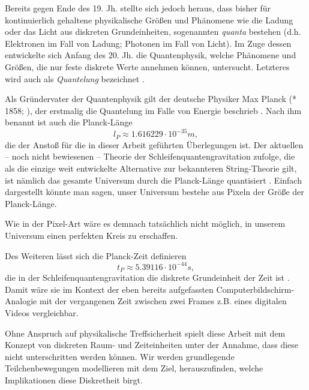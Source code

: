 \documentclass[a4paper,12pt,ngerman]{scrartcl}
\theoremstyle{plain}
\theoremstyle{plain}
\theoremstyle{plain}
\theoremstyle{plain}
\begin{document}
Bereits gegen Ende des 19. Jh. stellte sich jedoch heraus, dass bisher für kontinuierlich gehaltene physikalische Größen und Phänomene wie die Ladung oder das Licht aus diskreten Grundeinheiten, sogenannten \textit{quanta} bestehen (d.h. Elektronen im Fall von Ladung; Photonen im Fall von Licht). Im Zuge dessen entwickelte sich Anfang des 20. Jh. die Quantenphysik, welche Phänomene und Größen, die nur feste diskrete Werte annehmen können, untersucht. Letzteres wird auch als \textit{Quantelung} bezeichnet \cite{history}.

Als Gründervater der Quantenphysik gilt der deutsche Physiker Max Planck (* 1858; ), der erstmalig die Quantelung im Falle von Energie beschrieb \cite{history}. Nach ihm benannt ist auch die Planck-Länge
\[ l_P \approx 1.616 229 \cdot 10^{-35}m,\]
die der Anstoß für die in dieser Arbeit geführten Überlegungen ist. Der aktuellen -- noch nicht bewiesenen -- Theorie der Schleifenquantengravitation zufolge, die als die einzige weit entwickelte Alternative zur bekannteren String-Theorie gilt, ist nämlich das gesamte Universum durch die Planck-Länge quantisiert \cite{wiki:lqg}. Einfach dargestellt könnte man sagen, unser Universum bestehe aus Pixeln der Größe der Planck-Länge.

Wie in der Pixel-Art wäre es demnach tatsächlich nicht möglich, in unserem Universum einen perfekten Kreis zu erschaffen. 

Des Weiteren lässt sich die Planck-Zeit definieren
\[t_P \approx 5.39116\cdot 10^{-44}s,\]
die in der Schleifenquantengravitation die diskrete Grundeinheit der Zeit ist \cite{wiki:lqg}. Damit wäre sie im Kontext der eben bereits aufgefassten Computerbildschirm-Analogie mit der vergangenen Zeit zwischen zwei Frames z.B. eines digitalen Videos vergleichbar. 

Ohne Anspruch auf physikalische Treffsicherheit spielt diese Arbeit mit dem Konzept von diskreten Raum- und Zeiteinheiten unter der Annahme, dass diese nicht unterschritten werden können. Wir werden grundlegende Teilchenbewegungen modellieren mit dem Ziel, herauszufinden, welche Implikationen diese Diskretheit birgt. 



\end{document}
